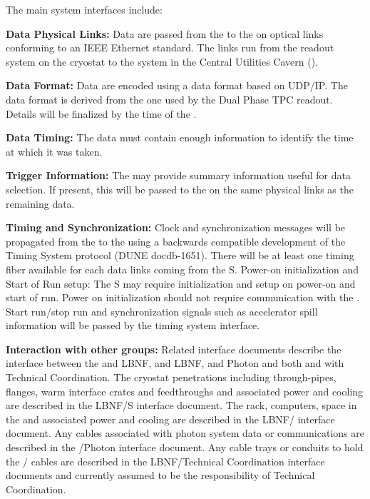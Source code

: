

The main system interfaces include:


\textbf{Data Physical Links: }Data are passed from the  to the  on optical links conforming to an IEEE Ethernet standard. The links run from the  readout system on the cryostat to the  system in the Central Utilities Cavern ().

\textbf{Data Format:} Data are encoded using a data format based on UDP/IP. The data format is derived from the one used by the Dual Phase TPC readout. Details will be finalized by the time of the  .

\textbf{Data Timing:} The data must contain enough information to identify the time  at which it was taken.

\textbf{Trigger Information:} The  may provide summary information useful for data selection. If present, this will be passed to the  on the same physical links as the remaining data.

\textbf{Timing and Synchronization: }Clock and synchronization messages will be propagated from the  to the  using a backwards compatible development of the  Timing System protocol (DUNE docdb-1651). There will be at least one timing fiber available for each data links coming from the S. Power-on initialization and Start of Run setup:  The S may require initialization and setup on power-on and start of run. Power on initialization should not require communication with the . Start run/stop run and synchronization signals such as accelerator spill information will be passed by the timing system interface.

\textbf{Interaction with other groups: }Related interface documents describe the interface between the  and LBNF,  and LBNF,  and Photon and both  and  with Technical Coordination. The cryostat penetrations including through-pipes, flanges, warm interface crates and feedthroughs and associated power and cooling are described in the LBNF/S interface document.  The rack, computers, space in the  and associated power and cooling are described in the LBNF/ interface document. Any cables associated with photon system data or communications are described in the /Photon interface document. Any cable trays or conduits to hold the / cables are described in the LBNF/Technical Coordination interface documents and currently assumed to be the responsibility of Technical Coordination.

